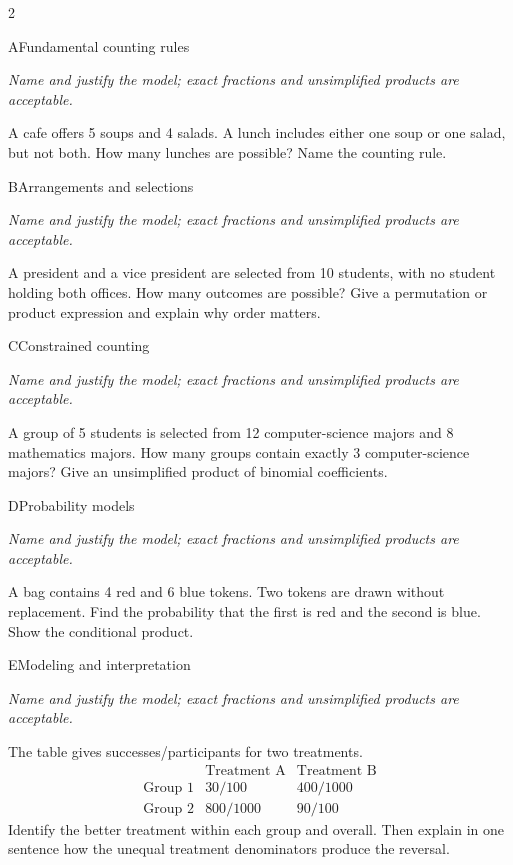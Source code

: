 \documentclass[9pt]{extarticle}
\begin{document}
\CoreWorkArea
\FormBreak
{}
\begin{multicols}{2}
\begin{CoreProblem}{A}{Fundamental counting rules}
{\scriptsize\textit{Name and justify the model; exact fractions and unsimplified products are acceptable.}\par}
A cafe offers 5 soups and 4 salads. A lunch includes either one soup
    or one salad, but not both. How many lunches are possible? Name the counting
    rule.
\end{CoreProblem}
\begin{CoreProblem}{B}{Arrangements and selections}
{\scriptsize\textit{Name and justify the model; exact fractions and unsimplified products are acceptable.}\par}
A president and a vice president are selected from 10 students, with
    no student holding both offices. How many outcomes are possible? Give a
    permutation or product expression and explain why order matters.
\end{CoreProblem}
\begin{CoreProblem}{C}{Constrained counting}
{\scriptsize\textit{Name and justify the model; exact fractions and unsimplified products are acceptable.}\par}
A group of 5 students is selected from 12 computer-science majors and
    8 mathematics majors. How many groups contain exactly 3 computer-science
    majors? Give an unsimplified product of binomial coefficients.
\end{CoreProblem}
\columnbreak
\begin{CoreProblem}{D}{Probability models}
{\scriptsize\textit{Name and justify the model; exact fractions and unsimplified products are acceptable.}\par}
A bag contains 4 red and 6 blue tokens. Two tokens are drawn without
    replacement. Find the probability that the first is red and the second is
    blue. Show the conditional product.
\end{CoreProblem}
\begin{CoreProblem}{E}{Modeling and interpretation}
{\scriptsize\textit{Name and justify the model; exact fractions and unsimplified products are acceptable.}\par}
The table gives successes/participants for two treatments.
    \[
    \begin{array}{c|cc}
      &\text{Treatment A}&\text{Treatment B}\\\hline
      \text{Group 1}&30/100&400/1000\\
      \text{Group 2}&800/1000&90/100
    \end{array}
    \]
    Identify the better treatment within each group and overall. Then explain in
    one sentence how the unequal treatment denominators produce the reversal.
\end{CoreProblem}
\end{multicols}
\end{document}
